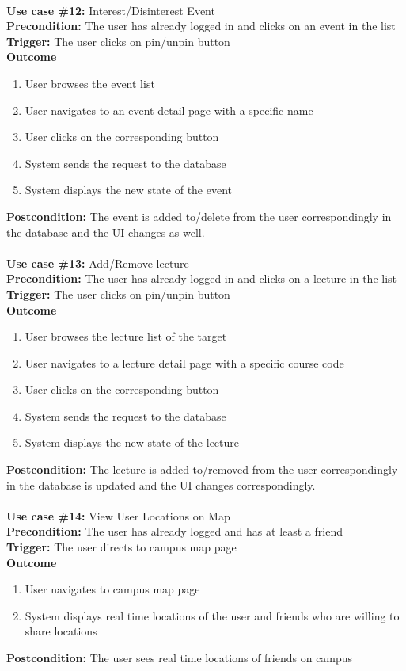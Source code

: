 \documentclass[12pt]{article}
\begin{document}
\noindent\\
\textbf{Use case \#12:} Interest/Disinterest Event\\
\textbf{Precondition:} The user has already logged in and clicks on an event in the list\\
\textbf{Trigger:} The user clicks on pin/unpin button\\
\textbf{Outcome}
\begin{enumerate}
	\item User browses the event list
	\item User navigates to an event detail page with a specific name
	\item User clicks on the corresponding button
    \item System sends the request to the database
    \item System displays the new state of the event
\end{enumerate}
\textbf{Postcondition:} The event is added to/delete from the user correspondingly in the database and the UI changes as well.\\


\noindent\\
\textbf{Use case \#13:} Add/Remove lecture\\
\textbf{Precondition:} The user has already logged in and clicks on a lecture in the list\\
\textbf{Trigger:} The user clicks on pin/unpin button\\
\textbf{Outcome}
\begin{enumerate}
	\item User browses the lecture list of the target
	\item User navigates to a lecture detail page with a specific course code
	\item User clicks on the corresponding button
    \item System sends the request to the database
    \item System displays the new state of the lecture
\end{enumerate}
\textbf{Postcondition:} The lecture is added to/removed from the user correspondingly in the database is updated and the UI changes correspondingly.\\


\noindent\\
\textbf{Use case \#14:} View User Locations on Map\\
\textbf{Precondition:} The user has already logged and has at least a friend\\
\textbf{Trigger:} The user directs to campus map page\\
\textbf{Outcome}
\begin{enumerate}
	\item User navigates to campus map page
    \item System displays real time locations of the user and friends who are willing to share locations
\end{enumerate}
\textbf{Postcondition:} The user sees real time locations of friends on campus
\end{document}
